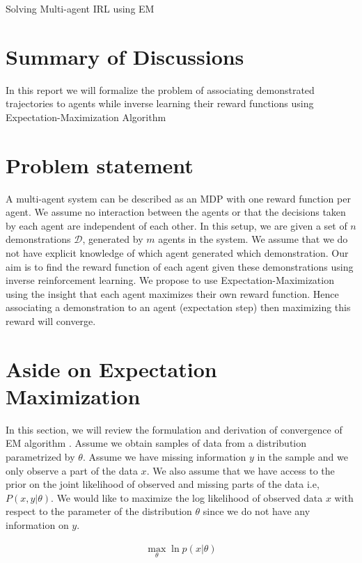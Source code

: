\documentclass{article}[11pt]
\begin{document}
\begin{center}
Solving Multi-agent IRL using EM
\end{center}

\section{Summary of Discussions}
In this report we will formalize the problem of associating demonstrated trajectories to agents while inverse learning their reward functions using Expectation-Maximization Algorithm



\section{Problem statement}
A multi-agent system can be described as an MDP with one reward function per agent. We assume no interaction between the agents or that the decisions taken by each agent are independent of each other. In this setup, we are given a set of $n$ demonstrations $\mathcal{D}$, generated by $m$ agents in the system. We assume that we do not have explicit knowledge of which agent generated which demonstration. Our aim is to find the reward function of each agent given these demonstrations using inverse reinforcement learning. We propose to use Expectation-Maximization using the insight that each agent maximizes their own reward function. Hence associating a demonstration to an agent (expectation step) then maximizing this reward will converge.

\section{Aside on Expectation Maximization}

In this section, we will review the formulation and derivation of convergence of EM algorithm \cite{ml}. Assume we obtain samples of data from a distribution parametrized by $\theta$. Assume we have missing information $y$ in the sample and we only observe a part of the data $x$. We also assume that we have access to the prior on the joint likelihood of observed and missing parts of the data i.e, $P(x,y|\theta)$. We would like to maximize the log likelihood of observed data $x$ with respect to the parameter of the distribution $\theta$ since we do not have any information on $y$.
 
\begin{align}
\label{em_objective}
\max_{\theta} \ln p(x|\theta)
\end{align}
\end{document}
